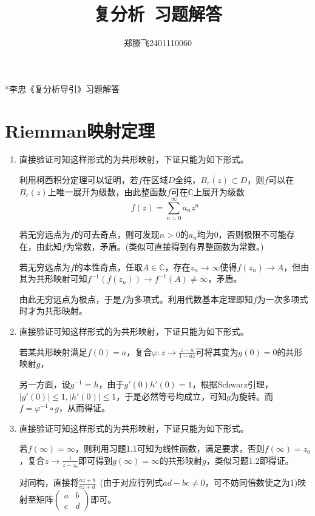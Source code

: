 \documentclass[a4paper,UTF8,fontset=windows,10pt]{ctexart}
\title{\heiti 复分析\ 习题解答}
\author{郑滕飞2401110060}
\date{}
\begin{document}
\maketitle

*李忠《复分析导引》习题解答

\tableofcontents

\newpage

\section{Riemman映射定理}
\begin{enumerate}
    \item 直接验证可知这样形式的为共形映射，下证只能为如下形式。
    
    利用柯西积分定理可以证明，若$f$在区域$D$全纯，$\overline{B_r(z)}\subset D$，则$f$可以在$B_r(z)$上唯一展开为级数，由此整函数$f$可在$\mathbb{C}$上展开为级数
    $$f(z)=\sum_{n=0}^\infty a_nz^n$$

    若无穷远点为$f$的可去奇点，则可发现$n>0$的$a_n$均为0，否则极限不可能存在，由此知$f$为常数，矛盾。(类似可直接得到有界整函数为常数。)

    若无穷远点为$f$的本性奇点，任取$A\in\mathbb{C}$，存在$z_n\to\infty$使得$f(z_n)\to A$，但由其为共形映射可知$f^{-1}(f(z_n))\to f^{-1}(A)\ne\infty$，矛盾。

    由此无穷远点为极点，于是$f$为多项式。利用代数基本定理即知$f$为一次多项式时才为共形映射。

    \item 直接验证可知这样形式的为共形映射，下证只能为如下形式。
    
    若某共形映射满足$f(0)=a$，复合$\varphi:z\to\frac{z-a}{1-\bar{a}z}$可将其变为$g(0)=0$的共形映射$g$，

    另一方面，设$g^{-1}=h$，由于$g'(0)h'(0)=1$，根据Schwarz引理，$|g'(0)|\le1,|h'(0)|\le1$，于是必然等号均成立，可知$g$为旋转。而$f=\varphi^{-1}\circ g$，从而得证。

    \item 直接验证可知这样形式的为共形映射，下证只能为如下形式。
    
    若$f(\infty)=\infty$，则利用习题1.1可知为线性函数，满足要求，否则$f(\infty)=z_0$，复合$z\to\frac{1}{z-z_0}$即可得到$g(\infty)=\infty$的共形映射$g$，类似习题1.2即得证。

    对同构，直接将$\frac{az+b}{cz+d}$\ (由于对应行列式$ad-bc\ne0$，可不妨同倍数使之为1)映射至矩阵$\begin{pmatrix}a&b\\c&d\end{pmatrix}$即可。


\end{enumerate}
\end{document}
